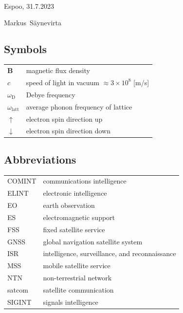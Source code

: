 \documentclass[english, 12pt, a4paper, elec, utf8, a-1b, online]{aaltothesis}
\begin{document}
\vspace{5cm}
Espoo, 31.7.2023

\vspace{5mm}
{\hfill Markus\ Säynevirta \hspace{1cm}}

\newpage

\thesistableofcontents


\subsection*{Symbols}

\begin{tabular}{ll}
$\mathbf{B}$  & magnetic flux density  \\
$c$              & speed of light in vacuum $\approx 3\times10^8$ [m/s]\\
$\omega_{\mathrm{D}}$    & Debye frequency \\
$\omega_{\mathrm{latt}}$ & average phonon frequency of lattice \\
$\uparrow$       & electron spin direction up\\
$\downarrow$     & electron spin direction down
\end{tabular}

\subsection*{Abbreviations}

\begin{tabular}{ll}
COMINT  & communications intelligence \\
ELINT   & electronic intelligence \\
EO      & earth observation \\
ES      & electromagnetic support \\
FSS     & fixed satellite service \\
GNSS    & global navigation satellite system \\
ISR     & intelligence, surveillance, and reconnaissance \\
MSS     & mobile satellite service \\
NTN     & non-terrestrial network \\
satcom  & satellite communication \\
SIGINT  & signals intelligence
\end{tabular}
\end{document}
